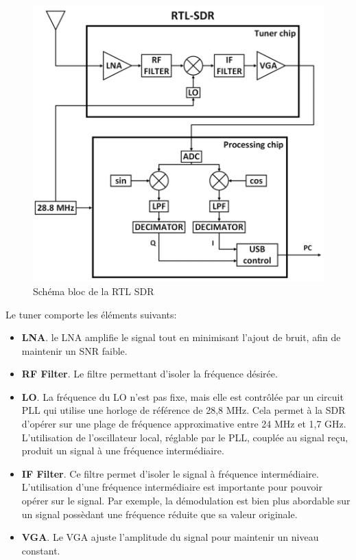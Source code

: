 \newpage

\begin{figure}[h]
\centering

\includegraphics[scale=0.5]{images/SB-rtlsdr.png}
\caption{Schéma bloc de la RTL SDR\cite{SBrtlsdr}}\label{term3000}
\end{figure}


Le tuner comporte les éléments suivants:
\begin{itemize}
\item \textbf{\ac{LNA}}. le \ac{LNA} amplifie le signal tout en minimisant l'ajout de bruit, afin de maintenir un SNR faible.
\item \textbf{\ac{RF} Filter}. Le filtre permettant d'isoler la fréquence désirée.
\item \textbf{\ac{LO}}. La fréquence du \ac{LO} n'est pas fixe, mais elle est contrôlée par un circuit \ac{PLL} qui utilise une horloge de référence de 28,8 MHz. Cela permet à la \ac{SDR} d'opérer sur une plage de fréquence approximative entre 24 MHz et 1,7 GHz. L'utilisation de l'oscillateur local, réglable par le \ac{PLL}, couplée au signal reçu, produit un signal à une fréquence intermédiaire.
\item \textbf{\ac{IF} Filter}. Ce filtre permet d'isoler le signal à fréquence intermédiaire. L'utilisation d'une fréquence intermédiaire est importante pour pouvoir opérer sur le signal. Par exemple, la démodulation est bien plus abordable sur un signal possèdant une fréquence réduite que sa valeur originale.
\item \textbf{\ac{VGA}}. Le \ac{VGA} ajuste l'amplitude du signal pour maintenir un niveau constant.
\end{itemize}

